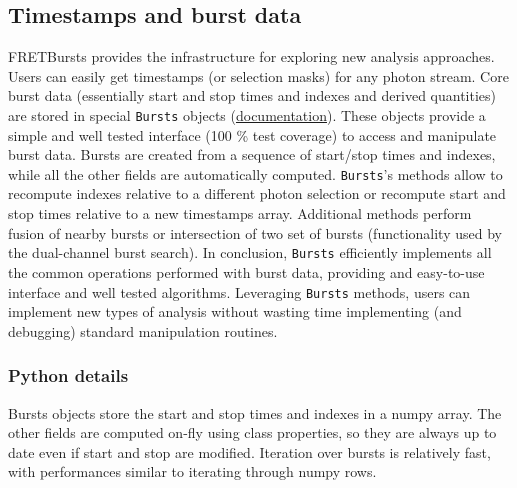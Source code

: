 \subsection{Timestamps and burst data}
\label{sec:burststimes}

FRETBursts provides the infrastructure for exploring new analysis approaches.
Users can easily get timestamps (or selection masks) for any photon stream.
Core burst data (essentially start and stop times and indexes 
and derived quantities) are stored in special \verb|Bursts| objects 
(\href{http://fretbursts.readthedocs.org/en/latest/burstsearch.html}{documentation}).
These objects provide a simple and well tested interface (100 \% test coverage) 
to access and manipulate burst data. Bursts are created from a sequence of start/stop 
times and indexes, while all the other fields are automatically
computed. \verb|Bursts|'s methods allow to recompute indexes relative to a different photon
selection or recompute start and stop times relative to a new timestamps array.
Additional methods perform fusion of nearby bursts or intersection of two set
of bursts (functionality used by the dual-channel burst search).
In conclusion, \verb|Bursts| efficiently implements all the common operations performed 
with burst data, providing and easy-to-use interface and well tested algorithms. 
Leveraging \verb|Bursts| methods, users can implement new types of analysis without 
wasting time implementing (and debugging) standard manipulation routines.

\subsubsection{Python details}
Bursts objects store the start and stop times and indexes in a numpy array.
The other fields are computed on-fly using class properties, so they are always
up to date even if start and stop are modified. Iteration over bursts is
relatively fast, with performances similar to iterating through numpy rows.

